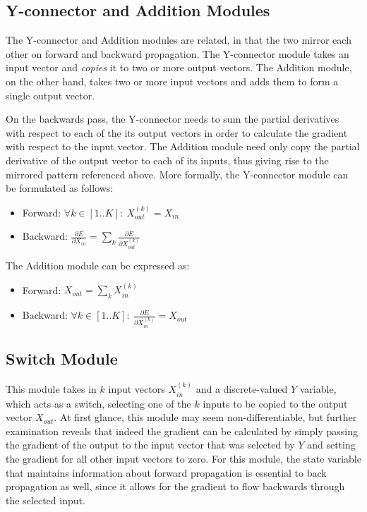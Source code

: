 \subsection{Y-connector and Addition Modules}

The Y-connector and Addition modules are related, in that the two mirror each other on forward and backward propagation.
The Y-connector module takes an input vector and \textit{copies} it to two or more output vectors.
The Addition module, on the other hand, takes two or more input vectors and adds them to form a single output vector.

On the backwards pass, the Y-connector needs to sum the partial derivatives with respect to each of the its output vectors in order to calculate the gradient with respect to the input vector.
The Addition module need only copy the partial derivative of the output vector to each of its inputs, thus giving rise to the mirrored pattern referenced above.
More formally, the Y-connector module can be formulated as follows:
\begin{itemize}
    \item Forward: $\forall k \in [1..K]: \ X_{out}^{(k)} = X_{in}$
    \item Backward: $\frac{\partial E}{\partial X_{in}} = \sum_k{\frac{\partial E}{\partial X_{out}^{(k)}}}$
\end{itemize}
The Addition module can be expressed as:
\begin{itemize}
    \item Forward: $X_{out} = \sum_k{X_{in}^{(k)}}$
    \item Backward: $\forall k \in [1..K]: \ \frac{\partial E}{\partial X_{in}^{(k)}} = X_{out}$
\end{itemize}

\subsection{Switch Module}

This module takes in $k$ input vectors $X_{in}^{(k)}$ and a discrete-valued $Y$ variable, which acts as a switch, selecting one of the $k$ inputs to be copied to the output vector $X_{out}$.
At first glance, this module may seem non-differentiable, but further examination reveals that indeed the gradient can be calculated by simply passing the gradient of the output to the input vector that was selected by $Y$ and setting the gradient for all other input vectors to zero.
For this module, the state variable that maintains information about forward propagation is essential to back propagation as well, since it allows for the gradient to flow backwards through the selected input. 

